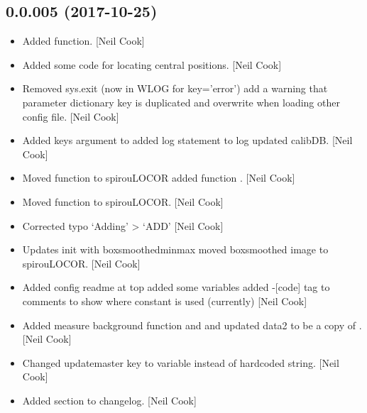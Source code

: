 \documentclass[a4paper,10pt,english]{report}
\begin{document}
\subsection{0.0.005 (2017-10-25)}
\label{\detokenize{misc/changelog:id546}}\begin{itemize}
\item {} 
Added  function. {[}Neil Cook{]}

\item {} 
Added some code for locating central positions. {[}Neil Cook{]}

\item {} 
Removed sys.exit (now in WLOG for key=’error’) add a warning that
parameter dictionary key is duplicated and overwrite when loading
other config file. {[}Neil Cook{]}

\item {} 
Added keys argument to  added log statement to log
updated calibDB. {[}Neil Cook{]}

\item {} 
Moved  function to spirouLOCOR added function
. {[}Neil Cook{]}

\item {} 
Moved  function to spirouLOCOR. {[}Neil Cook{]}

\item {} 
Corrected typo ‘Adding’ \textendash{}\textgreater{} ‘ADD’ {[}Neil Cook{]}

\item {} 
Updates init with boxsmoothedminmax moved boxsmoothed image to
spirouLOCOR. {[}Neil Cook{]}

\item {} 
Added config readme at top added some  variables added -{[}code{]}
tag to comments to show where constant is used (currently) {[}Neil Cook{]}

\item {} 
Added measure background function and  and
 updated data2 to be a copy of
. {[}Neil Cook{]}

\item {} 
Changed updatemaster key to variable instead of hardcoded string.
{[}Neil Cook{]}

\item {} 
Added  section to changelog. {[}Neil Cook{]}


\end{itemize}
\end{document}
